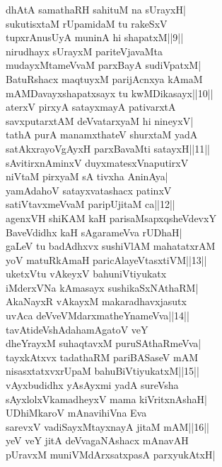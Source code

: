 \documentclass{article}
\begin{document}
dhAtA samathaRH sahituM na sUrayxH|\\
sukutisxtaM rUpamidaM tu rakeSxV\\
tupxrAnusUyA muninA hi shapatxM||9||\\
nirudhayx sUrayxM pariteVjavaMta\\
mudayxMtameVvaM parxBayA sudiVpatxM|\\
BatuRshacx maqtuyxM parijAcnxya kAmaM\\
mAMDavayxshapatxsayx tu kwMDikasayx||10||\\
aterxV pirxyA satayxmayA pativarxtA\\
savxputarxtAM deVvatarxyaM hi nineyxV|\\
tathA purA manamxthateV shurxtaM yadA\\
satAkxrayoVgAyxH parxBavaMti satayxH||11||\\
sAvitirxnAminxV duyxmatesxVnaputirxV\\
niVtaM pirxyaM sA tivxha AninAya|\\
yamAdahoV satayxvatashacx patinxV\\
satiVtavxmeVvaM paripUjitaM ca||12||\\
agenxVH shiKAM kaH parisaMsapxqsheVdevxY\\
BaveVdidhx kaH sAgarameVva rUDhaH|\\
gaLeV tu badAdhxvx sushiVlAM mahatatxrAM\\
yoV matuRkAmaH paricAlayeVtasxtiVM||13||\\
uketxVtu vAkeyxV bahuniVtiyukatx\\
iMderxVNa kAmasayx sushikaSxNAthaRM|\\
AkaNayxR vAkayxM makaradhavxjasutx\\
uvAca deVveVMdarxmatheYnameVva||14||\\
tavAtideVshAdahamAgatoV veY\\
dheYrayxM suhaqtavxM puruSAthaRmeVva|\\
tayxkAtxvx tadathaRM pariBASaseV mAM\\
nisasxtatxvxrUpaM bahuBiVtiyukatxM||15||\\
vAyxbudidhx yAsAyxmi yadA sureVsha\\
sAyxlolxVkamadheyxV mama kiVritxnAshaH|\\
UDhiMkaroV mAnavihiVna Eva\\
sarevxV vadiSayxMtayxnayA jitaM mAM||16||\\
yeV veY jitA deVvagaNAshacx mAnavAH\\
pUravxM muniVMdArxsatxpasA parxyukAtxH|\\
\end{document}
